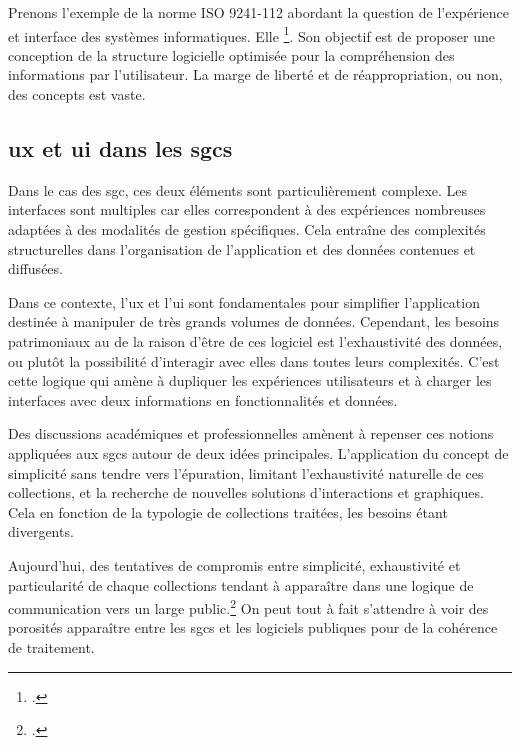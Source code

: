 Prenons l'exemple de la norme ISO 9241-112 abordant la question de l'expérience et interface des systèmes informatiques. Elle \footcite{ISO92411122025}. Son objectif est de proposer une conception de la structure logicielle optimisée pour la compréhension des informations par l’utilisateur. La marge de liberté et de réappropriation, ou non, des concepts est vaste.

\subsection{\gls{ux} et \gls{ui} dans les \glspl{sgc}}

Dans le cas des \gls{sgc}, ces deux éléments sont particulièrement complexe. Les interfaces sont multiples car elles correspondent à des expériences nombreuses adaptées à des modalités de gestion spécifiques. Cela entraîne des complexités structurelles dans l'organisation de l'application et des données contenues et diffusées.

Dans ce contexte, l'\gls{ux} et l'\gls{ui} sont fondamentales pour simplifier l'application destinée à manipuler de très grands volumes de données. Cependant, les besoins patrimoniaux au \coeur de la raison d'être de ces logiciel est l'exhaustivité des données, ou plutôt la possibilité d'interagir avec elles dans toutes leurs complexités. C'est cette logique qui amène à dupliquer les expériences utilisateurs et à charger les interfaces avec deux informations en fonctionnalités et données.

Des discussions académiques et professionnelles amènent à repenser ces notions appliquées aux \glspl{sgc} autour de deux idées principales. L'application du concept de simplicité sans tendre vers l'épuration, limitant l'exhaustivité naturelle de ces collections, et la recherche de nouvelles solutions d'interactions et graphiques. Cela en fonction de la typologie de collections traitées, les besoins étant divergents.

Aujourd'hui, des tentatives de compromis entre simplicité, exhaustivité et particularité de chaque collections tendant à apparaître dans une logique de communication vers un large public.\footcite{whitelawGenerousInterfacesDigital2015} On peut tout à fait s'attendre à voir des porosités apparaître entre les \glspl{sgc} et les logiciels publiques pour de la cohérence de traitement.

